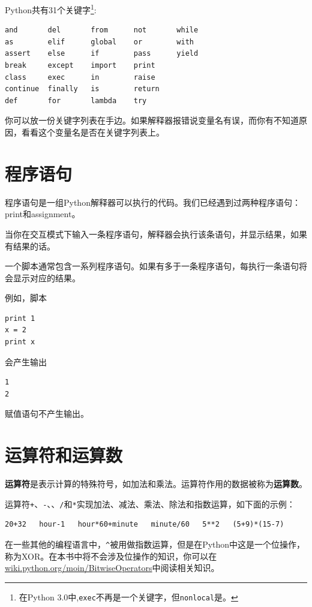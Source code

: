
Python共有31个关键字\footnote{在Python 3.0中,{\tt exec}不再是一个关键字，但{\tt nonlocal}是。}:

\beforeverb
\begin{verbatim}
and       del       from      not       while    
as        elif      global    or        with     
assert    else      if        pass      yield    
break     except    import    print              
class     exec      in        raise              
continue  finally   is        return             
def       for       lambda    try
\end{verbatim}
\afterverb
%
你可以放一份关键字列表在手边。如果解释器报错说变量名有误，而你有不知道原因，看看这个变量名是否在关键字列表上。

\section{程序语句}

程序语句是一组Python解释器可以执行的代码。我们已经遇到过两种程序语句：print和assignment。


当你在交互模式下输入一条程序语句，解释器会执行该条语句，并显示结果，如果有结果的话。

一个脚本通常包含一系列程序语句。如果有多于一条程序语句，每执行一条语句将会显示对应的结果。

例如，脚本

\beforeverb
\begin{verbatim}
print 1
x = 2
print x
\end{verbatim}
\afterverb
%
会产生输出

\beforeverb
\begin{verbatim}
1
2
\end{verbatim}
\afterverb
%
赋值语句不产生输出。

\section{运算符和运算数}

{\bf 运算符}是表示计算的特殊符号，如加法和乘法。运算符作用的数据被称为{\bf 运算数}。

运算符{\tt +}、{\tt -}、{\tt *}、{\tt /}和{\tt **}实现加法、减法、乘法、除法和指数运算，如下面的示例：

\beforeverb
\begin{verbatim}
20+32   hour-1   hour*60+minute   minute/60   5**2   (5+9)*(15-7)
\end{verbatim}
\afterverb
%
在一些其他的编程语言中，\verb"^"被用做指数运算，但是在Python中这是一个位操作，称为XOR。在本书中将不会涉及位操作的知识，你可以在\url{wiki.python.org/moin/BitwiseOperators}中阅读相关知识。

